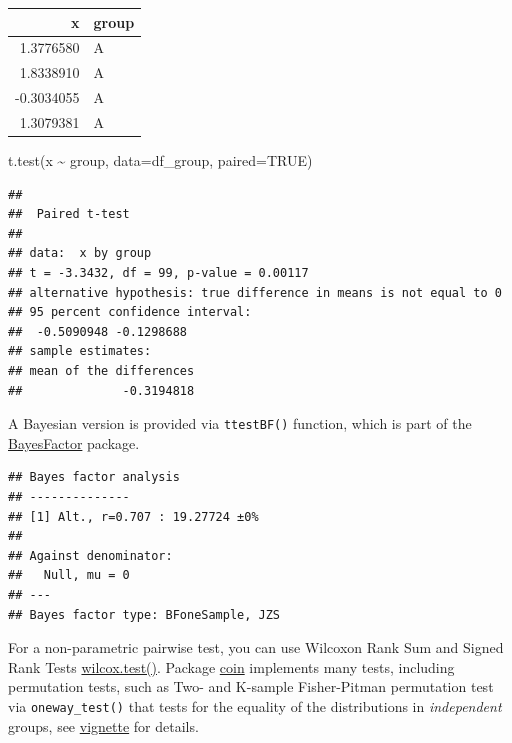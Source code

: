 \documentclass[
]{book}
\newenvironment{Shaded}{\begin{snugshade}}{\end{snugshade}}
\newcommand{\AttributeTok}[1]{\textcolor[rgb]{0.77,0.63,0.00}{#1}}
\newcommand{\ConstantTok}[1]{\textcolor[rgb]{0.00,0.00,0.00}{#1}}
\newcommand{\FunctionTok}[1]{\textcolor[rgb]{0.00,0.00,0.00}{#1}}
\newcommand{\NormalTok}[1]{#1}
\newcommand{\SpecialCharTok}[1]{\textcolor[rgb]{0.00,0.00,0.00}{#1}}
\begin{document}
\begin{tabular}{r|l}
\hline
x & group\\
\hline
1.3776580 & A\\
\hline
1.8338910 & A\\
\hline
-0.3034055 & A\\
\hline
1.3079381 & A\\
\hline
\end{tabular}

\begin{Shaded}
\begin{Highlighting}[]
\FunctionTok{t.test}\NormalTok{(x }\SpecialCharTok{\textasciitilde{}}\NormalTok{ group, }\AttributeTok{data=}\NormalTok{df\_group, }\AttributeTok{paired=}\ConstantTok{TRUE}\NormalTok{)}
\end{Highlighting}
\end{Shaded}

\begin{verbatim}
## 
##  Paired t-test
## 
## data:  x by group
## t = -3.3432, df = 99, p-value = 0.00117
## alternative hypothesis: true difference in means is not equal to 0
## 95 percent confidence interval:
##  -0.5090948 -0.1298688
## sample estimates:
## mean of the differences 
##              -0.3194818
\end{verbatim}

A Bayesian version is provided via \texttt{ttestBF()} function, which is part of the \href{https://richarddmorey.github.io/BayesFactor}{BayesFactor} package.

\begin{Shaded}
\end{Shaded}

\begin{verbatim}
## Bayes factor analysis
## --------------
## [1] Alt., r=0.707 : 19.27724 ±0%
## 
## Against denominator:
##   Null, mu = 0 
## ---
## Bayes factor type: BFoneSample, JZS
\end{verbatim}

For a non-parametric pairwise test, you can use Wilcoxon Rank Sum and Signed Rank Tests \href{https://stat.ethz.ch/R-manual/R-devel/library/stats/html/wilcox.test.html}{wilcox.test()}. Package \href{http://coin.r-forge.r-project.org/}{coin} implements many tests, including permutation tests, such as Two- and K-sample Fisher-Pitman permutation test via \texttt{oneway\_test()} that tests for the equality of the distributions in \emph{independent} groups, see \href{https://cran.r-project.org/web/packages/coin/vignettes/coin.pdf}{vignette} for details.
\end{document}
